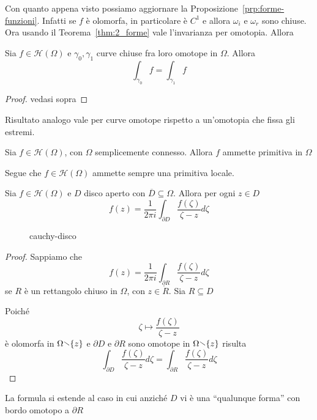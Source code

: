 Con quanto appena visto possiamo aggiornare la
Proposizione~\ref{prp:forme-funzioni}. Infatti se \(f\) è olomorfa, in
particolare è \(C^{1}\) e allora \(\omega_{i}\) e \(\omega_{r}\) sono chiuse.
Ora usando il Teorema~\ref{thm:2_forme} vale l'invarianza per omotopia. Allora
\begin{theorem}
    Sia \(f \in \mathcal{H}{(\Omega)}\) e \(\gamma_{0}, \gamma_{1}\) curve
    chiuse fra loro omotope in \(\Omega\). Allora
    \[
        \int_{\gamma_{0}} f = \int_{\gamma_{1}} f
    \]
\end{theorem}
\begin{proof}
    vedasi sopra
\end{proof}
Risultato analogo vale per curve omotope rispetto a un'omotopia che fissa gli
estremi.
\begin{corollary}
    Sia \(f \in \mathcal{H}{(\Omega)}\), con \(\Omega\) semplicemente connesso. Allora \(f\) ammette primitiva in \(\Omega\)
\end{corollary}
\begin{remark}
    Segue che \(f \in \mathcal{H}{(\Omega)}\) ammette sempre una primitiva
    locale.
\end{remark}

\begin{theorem}
    Sia \(f \in \mathcal{H}{(\Omega)}\) e \(D\) disco aperto con \(\overline{D}
    \subseteq \Omega \). Allora per ogni \(z \in D\)
    \[
        f{(z)} =\frac{1}{2\pi i} \int_{\partial D}
        \frac{f(\zeta)}{\zeta-z}d\zeta
    \]
\end{theorem}
\begin{figure}[ht]
    \centering
    \caption{cauchy-disco}
    \label{fig:cauchy-disco}
\end{figure}
\begin{proof}
    Sappiamo che
    \[
        f{(z)} = \frac{1}{2\pi i} \int_{\partial R}
        \frac{f(\zeta)}{\zeta-z}d\zeta
    \]
    se \(R\) è un rettangolo chiuso in \(\Omega\), con \(z \in \mathring{R}\).
    Sia \(R \subseteq D \)

    Poiché 
    \[
        \zeta \mapsto \frac{f{(\zeta)}}{\zeta - z}
    \]
    è olomorfa in \(\Omega \sminus \{z\} \) e \(\partial D\) e \(\partial R\)
    sono omotope in \(\Omega \sminus \{z\} \) risulta
    \[
        \int_{\partial D} \frac{f{(\zeta)}}{\zeta - z} d\zeta = \int_{\partial
        R} \frac{f{(\zeta)}}{\zeta - z} d\zeta
    \]
\end{proof}
\begin{remark}
    La formula si estende al caso in cui anziché \(D\) vi è una ``qualunque
    forma'' con bordo omotopo a \(\partial R\) 
\end{remark}

